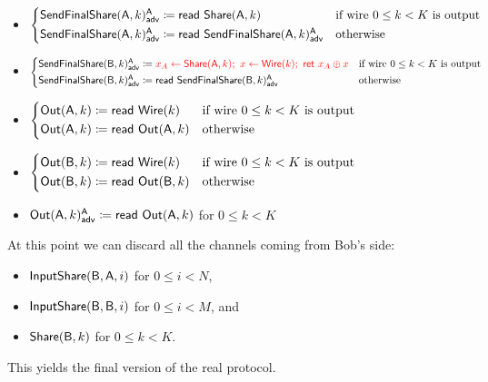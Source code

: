 \begin{itemize}
\item {\color{blue} $\begin{cases*} \LeakSendFinalShare(\A,k)^\A_\adv \coloneqq \read{\Share(\A,k)} & \text{if wire $0 \leq k < K$ is output} \\ \LeakSendFinalShare(\A,k)^\A_\adv \coloneqq \read{\LeakSendFinalShare(\A,k)^\A_\adv} & \text{otherwise} \end{cases*}$}
\item {\color{blue} $\begin{cases*} \LeakSendFinalShare(\B,k)^\A_\adv \coloneqq {\color{red} x_A \leftarrow \Share(\A,k); \ x \leftarrow \Wire(k); \ \ret{x_A \oplus x}} & \text{if wire $0 \leq k < K$ is output} \\ \LeakSendFinalShare(\B,k)^\A_\adv \coloneqq \read{\LeakSendFinalShare(\B,k)^\A_\adv} & \text{otherwise} \end{cases*}$}
\item $\begin{cases*} \Out(\A,k) \coloneqq \read{\Wire(k)} & \text{if wire $0 \leq k < K$ is output} \\ \Out(\A,k) \coloneqq \read{\Out(\A,k)} & \text{otherwise} \end{cases*}$
\item $\begin{cases*} \Out(\B,k) \coloneqq \read{\Wire(k)} & \text{if wire $0 \leq k < K$ is output} \\ \Out(\B,k) \coloneqq \read{\Out(\B,k)} & \text{otherwise} \end{cases*}$
\item {\color{blue} $\mathsf{Out}(\mathsf{A},k)^{\mathsf{A}}_{\mathsf{adv}} \coloneqq \mathsf{read} \ \mathsf{Out}(\mathsf{A},k)$ for $0 \leq k < K$}
\end{itemize}

\noindent At this point we can discard all the channels coming from Bob's side:
\begin{itemize}
\item $\mathsf{InputShare}(\mathsf{B},\mathsf{A},i)$ for $0 \leq i < N$,
\item $\mathsf{InputShare}(\mathsf{B},\mathsf{B},i)$ for $0 \leq i < M$, and
\item $\mathsf{Share}(\mathsf{B},k)$ for $0 \leq k < K$.
\end{itemize}
This yields the final version of the real protocol.

